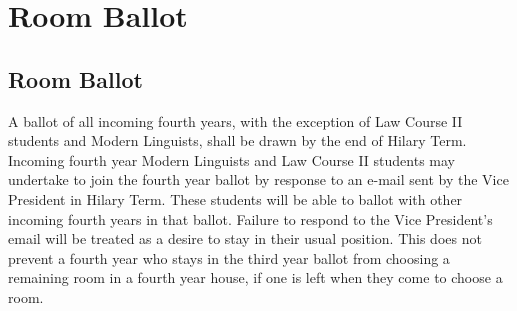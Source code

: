\chapter{Room Ballot}\label{App:RoomBallot}

\section{Room Ballot}

\npara A ballot of all incoming fourth years, with the exception of Law Course II students and Modern Linguists, shall be drawn by the end of Hilary Term. Incoming fourth year Modern Linguists and Law Course II students may undertake to join the fourth year ballot by response to an e-mail sent by the Vice President in Hilary Term. These students will be able to ballot with other incoming fourth years in that ballot. Failure to respond to the Vice President's email will be treated as a desire to stay in their usual position. This does not prevent a fourth year who stays in the third year ballot from choosing a remaining room in a fourth year house, if one is left when they come to choose a room.

